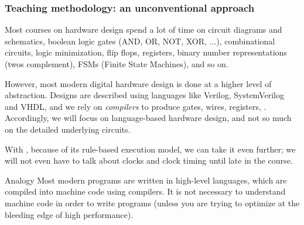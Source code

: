 \begin{frame}
\frametitle{Teaching methodology: an unconventional approach}

\footnotesize

Most courses on hardware design spend a lot of time on
circuit diagrams and schematics, boolean logic gates (AND, OR, NOT,
XOR, ...), combinational circuits, logic minimization, flip flops,
registers, binary number representations (twos complement), FSMs
(Finite State Machines), and so on.

\vspace{1ex}

However, most modern digital hardware design is done at a higher level
of abstraction.  Designs are described using languages like Verilog,
SystemVerilog and VHDL, and we rely on \emph{compilers} to produce
gates, wires, registers, {\etc}.  Accordingly, we will focus on
language-based hardware design, and not so much on the detailed
underlying circuits.

\vspace{1ex}

With {\BSV}, because of its rule-based execution model, we can take it
even further; we will not even have to talk about clocks and clock
timing until late in the course.

\vspace*{5ex}

\footnotesize

\begin{block}{Analogy}
Most modern programs are written in high-level languages, which are
compiled into machine code using compilers.  It is not necessary to
understand machine code in order to write programs (unless you are
trying to optimize at the bleeding edge of high performance).

\end{block}

\end{frame}






